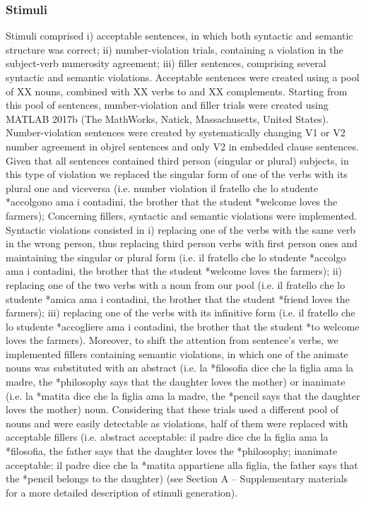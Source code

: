 \subsubsection{Stimuli}
Stimuli comprised i) acceptable sentences, in which both syntactic and semantic structure was correct; ii) number-violation trials, containing a violation in the subject-verb numerosity agreement; iii) filler sentences, comprising several syntactic and semantic violations. 
Acceptable sentences were created using a pool of XX nouns, combined with XX verbs to and XX complements.
Starting from this pool of sentences, number-violation and filler trials were created using MATLAB 2017b (The MathWorks, Natick, Massachusetts, United States).
Number-violation sentences were created by systematically changing V1 or V2 number agreement in objrel sentences and only V2 in embedded clause sentences. Given that all sentences contained third person (singular or plural) subjects, in this type of violation we replaced the singular form of one of the verbs with its plural one and viceversa (i.e. number violation il fratello che lo studente *accolgono ama i contadini, the brother that the student *welcome loves the farmers); 
Concerning fillers, syntactic and semantic violations were implemented. Syntactic violations consisted in i) replacing one of the verbs with the same verb in the wrong person, thus replacing third person verbs with first person ones and maintaining the singular or plural form (i.e. il fratello che lo studente *accolgo ama i contadini, the brother that the student *welcome loves the farmers); ii) replacing one of the two verbs with a noun from our pool (i.e. il fratello che lo studente *amica ama i contadini, the brother that the student *friend loves the farmers); iii) replacing one of the verbs with its infinitive form (i.e. il fratello che lo studente *accogliere ama i contadini, the brother that the student *to welcome loves the farmers). Moreover, to shift the attention from sentence’s verbs, we implemented fillers containing semantic violations, in which one of the animate nouns was substituted with an abstract (i.e. la *filosofia dice che la figlia ama la madre, the *philosophy says that the daughter loves the mother) or inanimate (i.e. la *matita dice che la figlia ama la madre, the *pencil says that the daughter loves the mother) noun. Considering that these trials used a different pool of nouns and were easily detectable as violations, half of them were replaced with acceptable fillers (i.e. abstract acceptable: il padre dice che la figlia ama la *filosofia, the father says that the daughter loves the *philosophy; inanimate acceptable: il padre dice che la *matita appartiene alla figlia, the father says that the *pencil belongs to the daughter) (see Section A – Supplementary materials for a more detailed description of stimuli generation).
